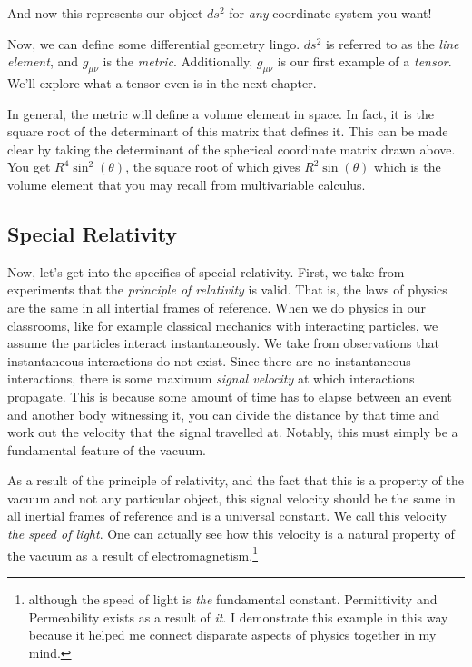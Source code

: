 \documentclass{article}
\begin{document}
And now this represents our object $ds^2$ for \textit{any} coordinate system you want! 

Now, we can define some differential geometry lingo. $ds^2$ is referred to as the \textit{line element}, and $g_{\mu\nu}$ is the \textit{metric}. Additionally, $g_{\mu\nu}$ is our first example of a \textit{tensor}. We'll explore what a tensor even is in the next chapter.

In general, the metric will define a volume element in space. In fact, it is the square root of the determinant of this matrix that defines it. This can be made clear by taking the determinant of the spherical coordinate matrix drawn above. You get $R^4\sin^2(\theta)$, the square root of which gives $R^2\sin(\theta)$ which is the volume element that you may recall from multivariable calculus.

\subsection{Special Relativity}
Now, let's get into the specifics of special relativity. First, we take from experiments that the \textit{principle of relativity} is valid. That is, the laws of physics are the same in all intertial frames of reference. When we do physics in our classrooms, like for example classical mechanics with interacting particles, we assume the particles interact instantaneously. We take from observations that instantaneous interactions do not exist. Since there are no instantaneous interactions, there is some maximum \textit{signal velocity} at which interactions propagate. This is because some amount of time has to elapse between an event and another body witnessing it, you can divide the distance by that time and work out the velocity that the signal travelled at. Notably, this must simply be a fundamental feature of the vacuum.

As a result of the principle of relativity, and the fact that this is a property of the vacuum and not any particular object, this signal velocity should be the same in all inertial frames of reference and is a universal constant. We call this velocity \textit{the speed of light}. One can actually see how this velocity is a natural property of the vacuum as a result of electromagnetism.\footnote{although the speed of light is \textit{the} fundamental constant. Permittivity and Permeability exists as a result of \textit{it}. I demonstrate this example in this way because it helped me connect disparate aspects of physics together in my mind.}
\end{document}
